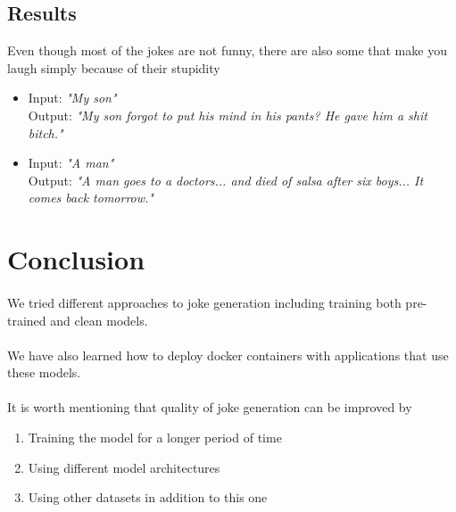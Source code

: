 \documentclass[12pt]{article}
\begin{document}
\subsection{Results}

Even though most of the jokes are not funny, there are also some that make you laugh simply because of their stupidity

\begin{itemize}
    \item Input: \textit{"My son"} \\
    Output: \textit{"My son forgot to put his mind in his pants? He gave him a shit bitch."}
    \item Input: \textit{"A man"} \\
    Output: \textit{"A man goes to a doctors... and died of salsa after six boys... It comes back tomorrow."}
\end{itemize}

\section{Conclusion}
\paragraph{}
We tried different approaches to joke generation including training both pre-trained and clean models.

\paragraph{}
We have also learned how to deploy docker containers with applications that use these models.

\paragraph{}
It is worth mentioning that quality of joke generation can be improved by
\begin{enumerate}
    \item Training the model for a longer period of time
    \item Using different model architectures
    \item Using other datasets in addition to this one
\end{enumerate}
\end{document}
